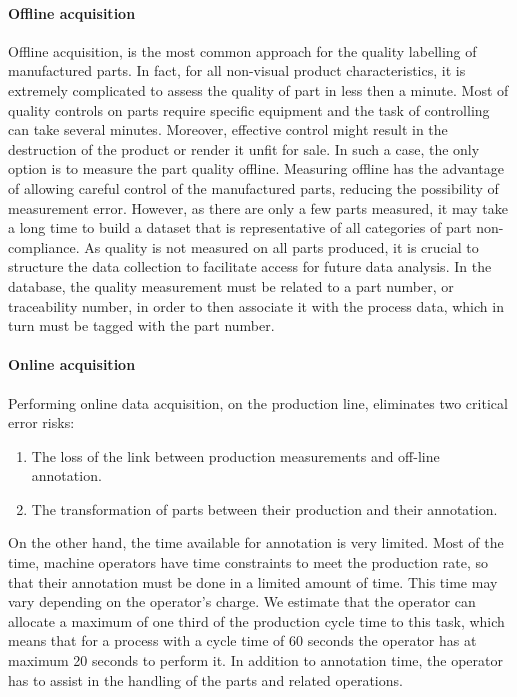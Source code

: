 \paragraph{Offline acquisition}

Offline acquisition, is the most common approach for the quality labelling of manufactured parts. In fact, for all non-visual product characteristics, it is extremely complicated to assess the quality of part in less then a minute. Most of quality controls on parts require specific equipment and the task of controlling can take several minutes. Moreover, effective control might result in the destruction of the product or render it unfit for sale. In such a case, the only option is to measure the part quality offline. Measuring offline has the advantage of allowing careful control of the manufactured parts, reducing the possibility of measurement error. However, as there are only a few parts measured, it may take a long time to build a dataset that is representative of all categories of part non-compliance. As quality is not measured on all parts produced, it is crucial to structure the data collection to facilitate access for future data analysis. In the database, the quality measurement must be related to a part number, or traceability number, in order to then associate it with the process data, which in turn must be tagged with the part number.

\paragraph{Online acquisition}

Performing online data acquisition, on the production line, eliminates two critical error risks:
\begin{enumerate}
    \item The loss of the link between production measurements and off-line annotation.
    \item The transformation of parts between their production and their annotation.
\end{enumerate}
%
On the other hand, the time available for annotation is very limited. Most of the time, machine operators have time constraints to meet the production rate, so that their annotation must be done in a limited amount of time. This time may vary depending on the operator's charge. We estimate that the operator can allocate a maximum of one third of the production cycle time to this task, which means that for a process with a cycle time of 60 seconds the operator has at maximum 20 seconds to perform it. In addition to annotation time, the operator has to assist in the handling of the parts and related operations.

